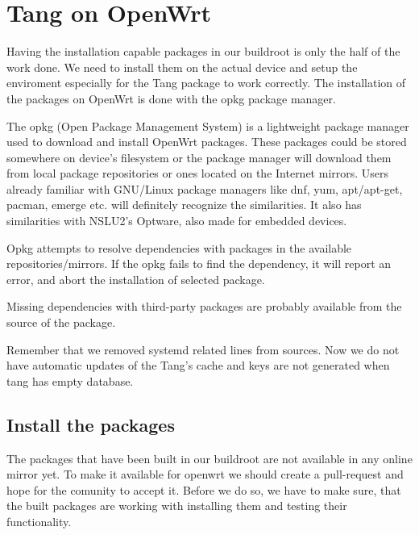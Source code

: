 \chapter{Tang on OpenWrt}\label{config}

Having the installation capable packages in our buildroot is only the half of the work done.
We need to install them on the actual device and setup the enviroment especially for the Tang package to work correctly.
The installation of the packages on OpenWrt is done with the opkg package manager.

The opkg (Open Package Management System) is a lightweight package manager used to download and install OpenWrt packages.
These packages could be stored somewhere on device's filesystem or the package manager will download them from local package repositories or ones located on the Internet mirrors.
Users already familiar with GNU/Linux package managers like dnf, yum, apt/apt-get, pacman, emerge etc. will definitely recognize the similarities.
It also has similarities with NSLU2's Optware, also made for embedded devices.

Opkg attempts to resolve dependencies with packages in the available repositories/mirrors.
If the opkg fails to find the dependency, it will report an error, and abort the installation of selected package.

Missing dependencies with third-party packages are probably available from the source of the package.

Remember that we removed systemd related lines from sources.
Now we do not have automatic updates of the Tang's cache and keys are not generated when tang has empty database.



\section{Install the packages}

The packages that have been built in our buildroot are not available in any online mirror yet.
To make it available for openwrt we should create a pull-request and hope for the comunity to accept it.
Before we do so, we have to make sure, that the built packages are working with installing them and testing their functionality.

